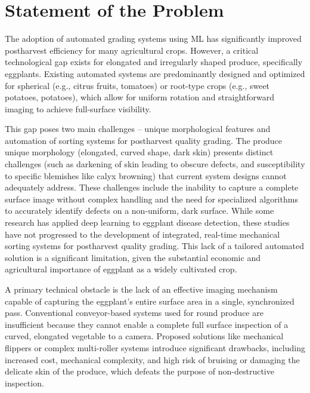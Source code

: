 {%

\section{Statement of the Problem}

The adoption of automated grading systems using ML has significantly improved postharvest efficiency for many agricultural crops. However, a critical technological gap exists for elongated and irregularly shaped produce, specifically eggplants. Existing automated systems are predominantly designed and optimized for spherical (e.g., citrus fruits, tomatoes) or root-type crops (e.g., sweet potatoes, potatoes), which allow for uniform rotation and straightforward imaging to achieve full-surface visibility.

This gap poses two main challenges – unique morphological features and automation of sorting systems for postharvest quality grading. The produce unique morphology (elongated, curved shape, dark skin) presents distinct challenges (such as darkening of skin leading to obscure defects, and susceptibility to specific blemishes like calyx browning) that current system designs cannot adequately address. These challenges include the inability to capture a complete surface image without complex handling and the need for specialized algorithms to accurately identify defects on a non-uniform, dark surface. While some research has applied deep learning to eggplant disease detection, these studies have not progressed to the development of integrated, real-time mechanical sorting systems for postharvest quality grading. This lack of a tailored automated solution is a significant limitation, given the substantial economic and agricultural importance of eggplant as a widely cultivated crop.

A primary technical obstacle is the lack of an effective imaging mechanism capable of capturing the eggplant's entire surface area in a single, synchronized pass. Conventional conveyor-based systems used for round produce are insufficient because they cannot enable a complete full surface inspection of a curved, elongated vegetable to a camera. Proposed solutions like mechanical flippers or complex multi-roller systems introduce significant drawbacks, including increased cost, mechanical complexity, and high risk of bruising or damaging the delicate skin of the produce, which defeats the purpose of non-destructive inspection.

}
